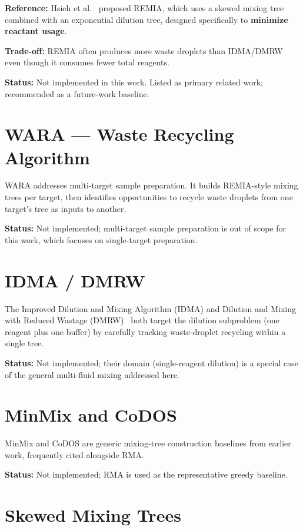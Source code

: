 \textbf{Reference:} Hsieh et al.~\cite{hsieh_remia} proposed REMIA, which uses a skewed mixing tree combined with an exponential dilution tree, designed specifically to \textbf{minimize reactant usage}.

\textbf{Trade-off:} REMIA often produces more waste droplets than IDMA/DMRW even though it consumes fewer total reagents.

\textbf{Status:} Not implemented in this work. Listed as primary related work; recommended as a future-work baseline.

\section{WARA --- Waste Recycling Algorithm}

WARA addresses multi-target sample preparation. It builds REMIA-style mixing trees per target, then identifies opportunities to recycle waste droplets from one target's tree as inputs to another.

\textbf{Status:} Not implemented; multi-target sample preparation is out of scope for this work, which focuses on single-target preparation.

\section{IDMA / DMRW}

The Improved Dilution and Mixing Algorithm (IDMA) and Dilution and Mixing with Reduced Wastage (DMRW)~\cite{waste_aware_2014} both target the dilution subproblem (one reagent plus one buffer) by carefully tracking waste-droplet recycling within a single tree.

\textbf{Status:} Not implemented; their domain (single-reagent dilution) is a special case of the general multi-fluid mixing addressed here.

\section{MinMix and CoDOS}

MinMix and CoDOS are generic mixing-tree construction baselines from earlier work, frequently cited alongside RMA.

\textbf{Status:} Not implemented; RMA is used as the representative greedy baseline.

\section{Skewed Mixing Trees}

